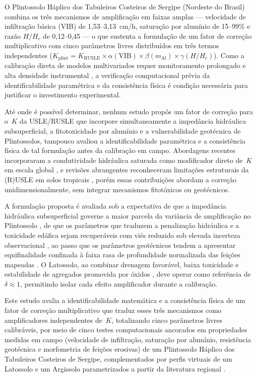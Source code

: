 \documentclass[pdflatex,sn-basic]{sn-jnl}
\begin{document}
O Plintossolo Háplico dos Tabuleiros Costeiros de Sergipe (Nordeste do Brasil) combina os três mecanismos de amplificação em faixas amplas --- velocidade de infiltração básica (VIB) de 1,53--3,13~cm/h, saturação por alumínio de 15--99\% e razão $H/H_c$ de 0,12--0,45 --- o que sustenta a formulação de um fator de correção multiplicativo com cinco parâmetros livres distribuídos em três termos independentes ($K_{\mathrm{plint}} = K_{\mathrm{RUSLE}} \times \alpha(\mathrm{VIB}) \times \beta(m_{\mathrm{Al}}) \times \gamma(H/H_c)$). Como a calibração direta de modelos multivariados requer monitoramento prolongado e alta densidade instrumental \citep{alewell_et_al_2019}, a verificação computacional prévia da identificabilidade paramétrica e da consistência física é condição necessária para justificar o investimento experimental.

Até onde é possível determinar, nenhum estudo propôs um fator de correção para o~$K$ da USLE/RUSLE que incorpore simultaneamente a impedância hidráulica subsuperficial, a fitotoxicidade por alumínio e a vulnerabilidade geotécnica de Plintossolos, tampouco avaliou a identificabilidade paramétrica e a consistência física de tal formulação antes da calibração em campo. Abordagens recentes incorporaram a condutividade hidráulica saturada como modificador direto de~$K$ em escala global \citep{gupta_et_al_2024}, e revisões abrangentes reconheceram limitações estruturais da (R)USLE em solos tropicais \citep{benavidez_et_al_2018}, porém essas contribuições abordam a correção unidimensionalmente, sem integrar mecanismos fitotóxicos ou geotécnicos.

A formulação proposta é avaliada sob a expectativa de que a impedância hidráulica subsuperficial governe a maior parcela da variância de amplificação no Plintossolo \citep{gupta_et_al_2024}, de que os parâmetros que traduzem a penalização hidráulica e a toxicidade edáfica sejam recuperáveis com viés reduzido sob elevada incerteza observacional \citep{cheviron_et_al_2010,rao_et_al_2016}, ao passo que os parâmetros geotécnicos tendem a apresentar equifinalidade confinada à faixa rasa de profundidade normalizada das feições mapeadas \citep{gudino_elizondo_et_al_2018}. O Latossolo, ao combinar drenagem favorável, baixa toxicidade e estabilidade de agregados promovida por óxidos \citep{barthes_roose_2002}, deve operar como referência de $\delta \approx 1$, permitindo isolar cada efeito amplificador durante a calibração.

Este estudo avalia a identificabilidade matemática e a consistência física de um fator de correção multiplicativo que traduz esses três mecanismos como amplificadores independentes de~$K$, totalizando cinco parâmetros livres calibráveis, por meio de cinco testes computacionais ancorados em propriedades medidas em campo (velocidade de infiltração, saturação por alumínio, resistência geotécnica e morfometria de feições erosivas) de um Plintossolo Háplico dos Tabuleiros Costeiros de Sergipe, complementados por perfis virtuais de um Latossolo e um Argissolo parametrizados a partir da literatura regional \citep{silva_et_al_2009,bertoni_lombardi_neto_2017}.
\end{document}
